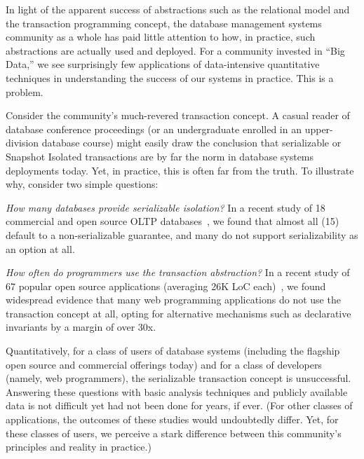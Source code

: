 
In light of the apparent success of abstractions such as the relational model and the transaction programming concept, the database management systems community as a whole has paid little attention to how, in practice, such abstractions are actually used and deployed. For a community invested in ``Big Data,'' we see surprisingly few applications of data-intensive quantitative techniques in understanding the success of our systems in practice. This is a problem.

 Consider the community's much-revered transaction concept. A casual reader of database conference proceedings (or an undergraduate enrolled in an upper-division database course) might easily draw the conclusion that serializable or Snapshot Isolated transactions are by far the norm in database systems deployments today. Yet, in practice, this is often far from the truth. To illustrate why, consider two simple questions: \begin{enumerateone}

\item \textit{How many databases provide serializable isolation?} In a recent study of 18 commercial and open source OLTP databases~\cite{hat-vldb}, we found that almost all (15) default to a non-serializable guarantee, and many do not support serializability as an option at all.

\item \textit{How often do programmers use the transaction abstraction?} In a recent study of 67 popular open source applications (averaging 26K LoC each)~\cite{feral-cc}, we found widespread evidence that many web programming applications do not use the transaction concept at all, opting for alternative mechanisms such as declarative invariants by a margin of over 30x.

\end{enumerateone}
Quantitatively, for a class of users of database systems (including the flagship open source and commercial offerings today) and for a class of developers (namely, web programmers), the serializable transaction concept is unsuccessful. Answering these questions with basic analysis techniques and publicly available data is not difficult yet had not been done for years, if ever. (For other classes of applications, the outcomes of these studies would undoubtedly differ. Yet, for these classes of users, we perceive a stark difference between this community's principles and reality in practice.)

